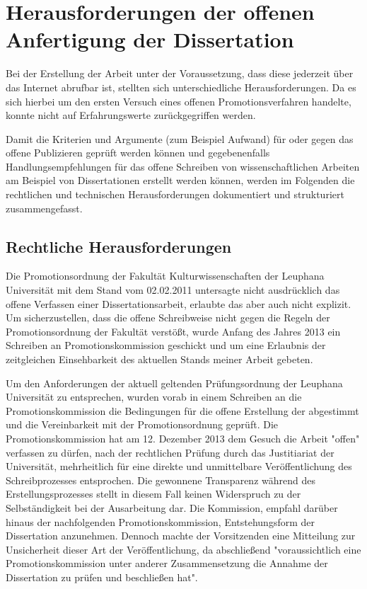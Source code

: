 \section{Herausforderungen der offenen Anfertigung der Dissertation}

Bei der Erstellung der Arbeit unter der Voraussetzung, dass diese jederzeit über das Internet abrufbar ist, stellten sich unterschiedliche Herausforderungen. Da es sich hierbei um den ersten Versuch eines offenen Promotionsverfahren handelte, konnte nicht auf Erfahrungswerte zurückgegriffen werden.

Damit die Kriterien und Argumente (zum Beispiel Aufwand) für oder gegen das offene Publizieren geprüft werden können und gegebenenfalls Handlungsempfehlungen für das offene Schreiben von wissenschaftlichen Arbeiten am Beispiel von Dissertationen erstellt werden können, werden im Folgenden die rechtlichen und technischen Herausforderungen dokumentiert und strukturiert zusammengefasst.

\subsection{Rechtliche Herausforderungen}

Die Promotionsordnung der Fakultät Kulturwissenschaften der Leuphana Universität mit dem Stand vom 02.02.2011 untersagte nicht ausdrücklich das offene Verfassen einer Dissertationsarbeit, erlaubte das aber auch nicht explizit. Um sicherzustellen, dass die offene Schreibweise nicht gegen die Regeln der Promotionsordnung der Fakultät verstößt, wurde Anfang des Jahres 2013 ein Schreiben an Promotionskommission geschickt und um eine Erlaubnis der zeitgleichen Einsehbarkeit des aktuellen Stands meiner Arbeit gebeten.

Um den Anforderungen der aktuell geltenden Prüfungsordnung der Leuphana Universität zu entsprechen, wurden vorab in einem Schreiben an die Promotionskommission die Bedingungen für die offene Erstellung der abgestimmt und die Vereinbarkeit mit der Promotionsordnung geprüft. Die Promotionskommission hat am 12. Dezember 2013 dem Gesuch die Arbeit "offen" verfassen zu dürfen, nach der rechtlichen Prüfung durch das Justitiariat der Universität, mehrheitlich für eine direkte und unmittelbare Veröffentlichung des Schreibprozesses entsprochen. Die gewonnene Transparenz während des Erstellungsprozesses stellt in diesem Fall keinen Widerspruch zu der Selbständigkeit bei der Ausarbeitung dar. Die Kommission, empfahl darüber hinaus der nachfolgenden Promotionskommission, Entstehungsform der Dissertation anzunehmen. Dennoch machte der Vorsitzenden eine Mitteilung zur Unsicherheit dieser Art der Veröffentlichung, da abschließend "voraussichtlich eine Promotionskommission unter anderer Zusammensetzung die Annahme der Dissertation zu prüfen und beschließen hat".

